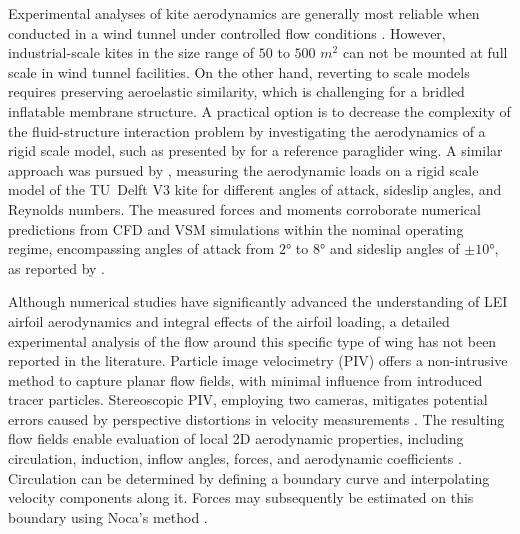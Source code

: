 \documentclass[wes, manuscript]{copernicus}
\begin{document}
Experimental analyses of kite aerodynamics are generally most reliable when conducted in a wind tunnel under controlled flow conditions \citep{DeWachter2008,Desai2024}. However, industrial-scale kites in the size range of $50$ to $500$ $\unit{m^2}$ can not be mounted at full scale in wind tunnel facilities. On the other hand, reverting to scale models requires preserving aeroelastic similarity, which is challenging for a bridled inflatable membrane structure. A practical option is to decrease the complexity of the fluid-structure interaction problem by investigating the aerodynamics of a rigid scale model, such as presented by \cite{Belloc2015} for a reference paraglider wing. A similar approach was pursued by \cite{Poland2025a}, measuring the aerodynamic loads on a rigid scale model of the TU~Delft V3 kite for different angles of attack, sideslip angles, and Reynolds numbers. The measured forces and moments corroborate numerical predictions from CFD and VSM simulations within the nominal operating regime, encompassing angles of attack from $2\unit{\degree}$ to $8\unit{\degree}$ and sideslip angles of $\pm10\unit{\degree}$, as reported by \cite{Cayon2025a}. 

Although numerical studies have significantly advanced the understanding of LEI airfoil aerodynamics and integral effects of the airfoil loading, a detailed experimental analysis of the flow around this specific type of wing has not been reported in the literature. Particle image velocimetry (PIV) offers a non-intrusive method to capture planar flow fields, with minimal influence from introduced tracer particles. Stereoscopic PIV, employing two cameras, mitigates potential errors caused by perspective distortions in velocity measurements \citep{Prasad2000}. The resulting flow fields enable evaluation of local 2D aerodynamic properties, including circulation, induction, inflow angles, forces, and aerodynamic coefficients \citep{Fritz2024a}. Circulation can be determined by defining a boundary curve and interpolating velocity components along it. Forces may subsequently be estimated on this boundary using Noca's method \citep{Noca1999}.
\end{document}
